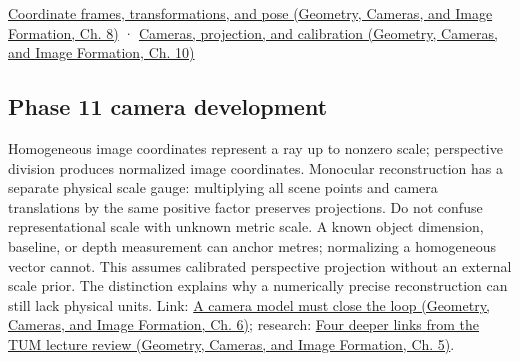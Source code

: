 \href{../03-Geometry-Cameras-and-Image-Formation/main.pdf\#nameddest=03-visual-computing-i-ch001-coordinate-frames-transformations-and-pose}{Coordinate frames, transformations, and pose (Geometry, Cameras, and Image Formation, Ch. 8)} · \href{../03-Geometry-Cameras-and-Image-Formation/main.pdf\#nameddest=03-visual-computing-i-ch003-cameras-projection-and-calibration}{Cameras, projection, and calibration (Geometry, Cameras, and Image Formation, Ch. 10)}

\subsection{Phase 11 camera development}\label{appendix-cb3b26862282-phase-11-camera-development}

\hypertarget{appendix-cb3b26862282-phase-11-camera-development}{}

Homogeneous image coordinates represent a ray up to nonzero scale; perspective division produces normalized image coordinates. Monocular reconstruction has a separate physical scale gauge: multiplying all scene points and camera translations by the same positive factor preserves projections. Do not confuse representational scale with unknown metric scale. A known object dimension, baseline, or depth measurement can anchor metres; normalizing a homogeneous vector cannot. This assumes calibrated perspective projection without an external scale prior. The distinction explains why a numerically precise reconstruction can still lack physical units. Link: \href{../03-Geometry-Cameras-and-Image-Formation/main.pdf\#nameddest=02-foundations-ii-ch037-a-camera-model-must-close-the-loop}{A camera model must close the loop (Geometry, Cameras, and Image Formation, Ch. 6)}; research: \href{../03-Geometry-Cameras-and-Image-Formation/main.pdf\#nameddest=02-foundations-ii-ch036-four-deeper-links-from-the-tum-lecture-review}{Four deeper links from the TUM lecture review (Geometry, Cameras, and Image Formation, Ch. 5)}.
